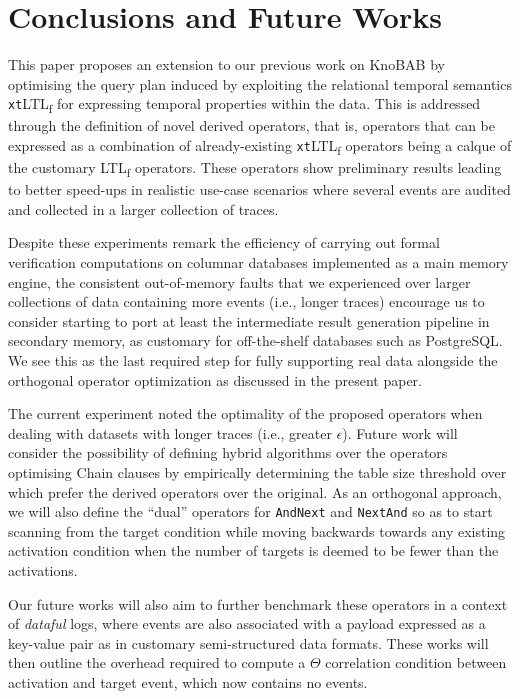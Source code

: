 \documentclass[sigconf]{acmart}
\begin{document}

\section{Conclusions and Future Works}
This paper proposes an extension to our previous work on KnoBAB by optimising the query plan induced by exploiting the relational temporal semantics \texttt{xt}LTL\textsubscript{f} for expressing temporal properties within the data. This is addressed through the definition of novel derived operators, that is, operators that can be expressed as a combination of already-existing \texttt{xt}LTL\textsubscript{f} operators being a calque of the customary LTL\textsubscript{f} operators. These operators show preliminary results leading to better speed-ups in realistic use-case scenarios where several events are audited and collected in a larger collection of traces.

Despite these experiments remark the efficiency of carrying out formal verification computations on columnar databases implemented as a main memory engine, the consistent out-of-memory faults that we experienced over larger collections of data containing more events (i.e., longer traces) encourage us to consider starting to port at least the intermediate result generation pipeline in secondary memory, as customary for off-the-shelf databases such as PostgreSQL. We see this as the last required step for fully supporting real data alongside the orthogonal operator optimization as discussed in the present paper. 

The current experiment noted the optimality of the proposed operators when dealing with datasets with longer traces (i.e., greater $\epsilon$). Future work will consider the possibility of defining hybrid algorithms \cite{4567924} over the operators optimising Chain clauses  by empirically determining the table size threshold over which prefer the derived operators over the original. As an orthogonal approach, we will also define the ``dual'' operators for \texttt{AndNext} and \texttt{NextAnd} so as to start scanning from the target condition while moving backwards towards any existing activation condition when the number of targets is deemed to be fewer than the activations. 

Our future works will also aim to further benchmark these operators in a context of \textit{dataful} logs, where events are also associated with a payload expressed as a key-value pair as in customary semi-structured data formats. These works will then outline the overhead required to compute a $\Theta$ correlation condition between activation and target event, which now contains no events. 
\end{document}
